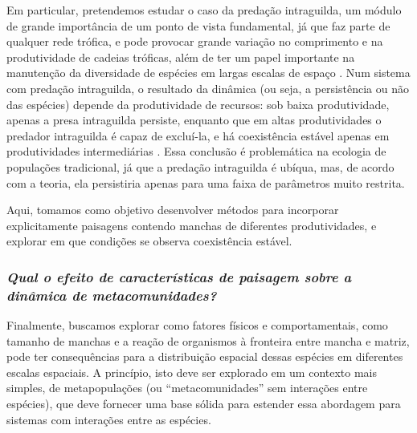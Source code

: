 \documentclass[12pt]{extarticle}
\begin{document}
Em particular, pretendemos estudar o caso da predação intraguilda, um módulo
de grande importância de um ponto de vista fundamental, já que faz parte de
qualquer rede trófica, e pode provocar grande variação no comprimento e na
produtividade de cadeias tróficas, além de ter um papel importante na
manutenção da diversidade de espécies em largas escalas de espaço
\citep{mccann2011}. Num sistema com predação intraguilda, o resultado da
dinâmica (ou seja, a persistência ou não das espécies) depende da
produtividade de recursos: sob baixa produtividade, apenas a presa intraguilda
persiste, enquanto que em altas produtividades o predador intraguilda é capaz
de excluí-la, e há coexistência estável apenas em produtividades
intermediárias \citep{holt1997}. Essa conclusão é problemática na ecologia de
populações tradicional, já que a predação intraguilda é ubíqua, mas, de acordo
com a teoria, ela persistiria apenas para uma faixa de parâmetros muito
restrita.

Aqui, tomamos como objetivo desenvolver métodos para incorporar explicitamente
paisagens contendo manchas de diferentes produtividades, e explorar em que
condições se observa coexistência estável.

\subsubsection*{\em Qual o efeito de características de paisagem sobre a
dinâmica de metacomunidades?}

Finalmente, buscamos explorar como fatores físicos e comportamentais, como
tamanho de manchas e a reação de organismos à fronteira entre mancha e matriz,
pode ter consequências para a distribuição espacial dessas espécies em
diferentes escalas espaciais. A princípio, isto deve ser explorado em um
contexto mais simples, de metapopulações \citep{ovaskainen2004} (ou
``metacomunidades'' sem interações entre espécies), que deve fornecer uma base
sólida para estender essa abordagem para sistemas com interações entre as
espécies. 
\end{document}
